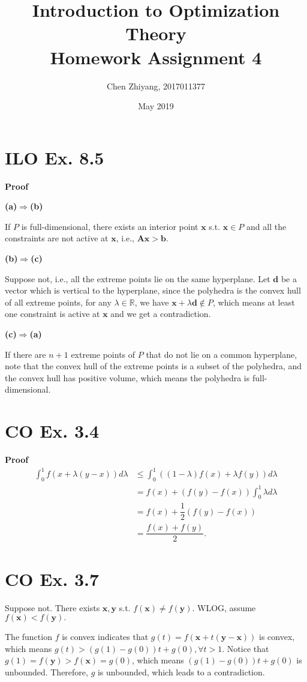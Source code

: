 \documentclass[12pt]{article}
\title{Introduction to Optimization Theory\\Homework Assignment 4}
\author{Chen Zhiyang, 2017011377}
\date{May 2019}
\begin{document}
\maketitle

\section*{ILO Ex. 8.5}
\textbf{Proof}

\textbf{(a)}$\Rightarrow$\textbf{(b)}

If $P$ is full-dimensional, there exists an interior point $\bm{x}$ s.t. $\bm{x}\in P$ and all the constraints are not active at $\bm{x}$, i.e., $\bm{Ax}>\bm{b}$.

\textbf{(b)}$\Rightarrow$\textbf{(c)}

Suppose not, i.e., all the extreme points lie on the same hyperplane. Let $\bm{d}$ be a vector which is vertical to the hyperplane, since the polyhedra is the convex hull of all extreme points, for any $\lambda\in\mathbb{R}$, we have $\bm{x}+\lambda\bm{d}\notin P$, which means at least one constraint is active at $\bm{x}$ and we get a contradiction.

\textbf{(c)}$\Rightarrow$\textbf{(a)}

If there are $n+1$ extreme points of $P$ that do not lie on a common hyperplane, note that the convex hull of the extreme points is a subset of the polyhedra, and the convex hull has positive volume, which means the polyhedra is full-dimensional.

\section*{CO Ex. 3.4}
\textbf{Proof}
\begin{align*}
\int_0^1 f(x+\lambda(y-x))d\lambda&\le\int_0^1((1-\lambda)f(x)+\lambda f(y))d\lambda\\
&=f(x)+(f(y)-f(x))\int_0^1\lambda d\lambda\\
&=f(x)+\dfrac{1}{2}(f(y)-f(x))\\
&=\dfrac{f(x)+f(y)}{2}.
\end{align*}

\section*{CO Ex. 3.7}
Suppose not. There exists $\bm{x},\bm{y}$ s.t. $f(\bm{x})\neq f(\bm{y})$. WLOG, assume $f(\bm{x})<f(\bm{y}).$

The function $f$ is convex indicates that $g(t)=f(\bm{x}+t(\bm{y}-\bm{x}))$ is convex, which means $g(t)>(g(1)-g(0))t+g(0),\forall t>1$. Notice that $g(1)=f(\bm{y})>f(\bm{x})=g(0)$, which means $(g(1)-g(0))t+g(0)$ is unbounded. Therefore, $g$ is unbounded, which leads to a contradiction.
\end{document}
